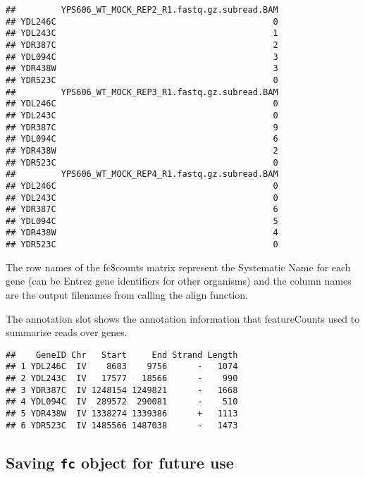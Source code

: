 \documentclass[
]{book}
\newenvironment{Shaded}{\begin{snugshade}}{\end{snugshade}}
\newcommand{\FunctionTok}[1]{\textcolor[rgb]{0.13,0.29,0.53}{\textbf{#1}}}
\newcommand{\NormalTok}[1]{#1}
\newcommand{\SpecialCharTok}[1]{\textcolor[rgb]{0.81,0.36,0.00}{\textbf{#1}}}
\begin{document}
\begin{verbatim}
##         YPS606_WT_MOCK_REP2_R1.fastq.gz.subread.BAM
## YDL246C                                           0
## YDL243C                                           1
## YDR387C                                           2
## YDL094C                                           3
## YDR438W                                           3
## YDR523C                                           0
##         YPS606_WT_MOCK_REP3_R1.fastq.gz.subread.BAM
## YDL246C                                           0
## YDL243C                                           0
## YDR387C                                           9
## YDL094C                                           6
## YDR438W                                           2
## YDR523C                                           0
##         YPS606_WT_MOCK_REP4_R1.fastq.gz.subread.BAM
## YDL246C                                           0
## YDL243C                                           0
## YDR387C                                           6
## YDL094C                                           5
## YDR438W                                           4
## YDR523C                                           0
\end{verbatim}

The row names of the fc\$counts matrix represent the Systematic Name for each gene (can be Entrez gene identifiers for other organisms) and the column names are the output filenames from calling the align function.

The annotation slot shows the annotation information that featureCounts used to summarise reads over genes.

\begin{Shaded}
\end{Shaded}

\begin{verbatim}
##    GeneID Chr   Start     End Strand Length
## 1 YDL246C  IV    8683    9756      -   1074
## 2 YDL243C  IV   17577   18566      -    990
## 3 YDR387C  IV 1248154 1249821      -   1668
## 4 YDL094C  IV  289572  290081      -    510
## 5 YDR438W  IV 1338274 1339386      +   1113
## 6 YDR523C  IV 1485566 1487038      -   1473
\end{verbatim}

\hypertarget{saving-fc-object-for-future-use}{%
\subsection{\texorpdfstring{Saving \texttt{fc} object for future use}{Saving fc object for future use}}\label{saving-fc-object-for-future-use}}
\end{document}
